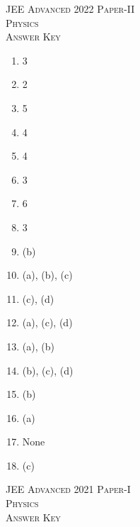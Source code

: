 \documentclass{article}
\begin{document}
\pagebreak

\begin{center}
    \textsc{JEE Advanced 2022 Paper-II\\Physics\\Answer Key}
\end{center}

\begin{multicols}{4}
    \begin{enumerate}
        \item 3
        \item 2
        \item 5
        \item 4
        \item 4
        \item 3
        \item 6
        \item 3
        \item (b)
        \item (a), (b), (c)
        \item (c), (d)
        \item (a), (c), (d)
        \item (a), (b)
        \item (b), (c), (d)
        \item (b)
        \item (a)
        \item None
        \item (c)
    \end{enumerate}
\end{multicols}

\pagebreak

\begin{center}
    \textsc{JEE Advanced 2021 Paper-I\\Physics\\Answer Key}
\end{center}
\end{document}
